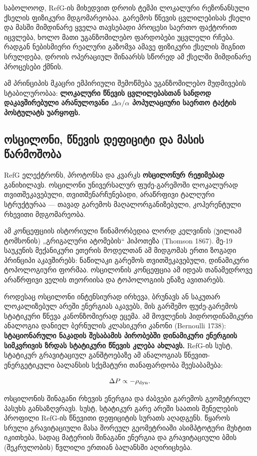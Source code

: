 \documentclass[11pt,a4paper]{article}
\begin{document}
საბოლოოდ, RefG-ის მიხედვით დროის ტემპი ლოკალური რეზონანსული ქსელის ფიზიკური მდგომარეობაა. გარემოს წნევის ცვლილებისას ქსელი და მასში მიმდინარე ყველა თავსებადი პროცესი საერთო ფაქტორით იცვლება, ხოლო მათი უგანზომილებო ფარდობები უცვლელი რჩება. რადგან ნებისმიერი რეალური გაზომვა ამავე ფიზიკური ქსელის შიგნით სრულდება, დროის ოპერაციულ შინაარსს სწორედ ამ ქსელში მიმდინარე პროცესები ქმნის.

ამ პრინციპის მკაცრი ემპირიული შემოწმება უგანზომილებო მუდმივების სტაბილურობაა: \textbf{ლოკალური წნევის ცვლილებასთან სანდოდ დაკავშირებული არანულოვანი $\Delta\alpha/\alpha$ პოპულაციური საერთო ტაქტის პოსტულატს უარყოფს.}


\subsection{ოსცილონი, წნევის დეფიციტი და მასის წარმოშობა}

RefG ელექტრონს, პროტონსა და კვარკს \textbf{ოსცილონურ რეჟიმებად} განიხილავს. ოსცილონი უნივერსალურ ფუძე-გარემოში ლოკალურად თვითშეკავებული, თვითშენარჩუნებადი, არაწრფივი ტალღური სტრუქტურაა — თავად გარემოს მაღალორგანიზებული, კოჰერენტული რხევითი მდგომარეობა.

ამ კონცეფციის ისტორიული წინამორბედია ლორდ კელვინის (უილიამ ტომსონის) „გრიგალური ატომების“ ჰიპოთეზა (Thomson 1867). მე-19 საუკუნის მექანიკური ეთერის მოდელთან ამ მიდგომას ერთი ზოგადი პრინციპი აკავშირებს: ნაწილაკი გარემოს თვითშეკავებული, დინამიკური ტოპოლოგიური ფორმაა. ოსცილონის კონცეფცია ამ იდეას თანამედროვე არაწრფივი ველის თეორიისა და ტოპოლოგიის ენაზე ავითარებს.

როდესაც ოსცილონი ინტენსიურად ირხევა, ბრუნავს ან საკუთარ ლოკალიზებულ არეში ენერგიას აკავებს, მის გარშემო ფუძე-გარემოს სტატიკური წნევა კანონზომიერად ეცემა. ამ მოვლენის ჰიდროდინამიკური ანალოგია დანიელ ბერნულის კლასიკური კანონი (Bernoulli 1738): \textbf{სტაციონარული ნაკადის შესაბამის პირობებში დინამიკური ენერგიის სიმკვრივის ზრდას სტატიკური წნევის კლება ახლავს.} RefG-ის სუსტ, სტატიკურ გრავიტაციულ განშტოებაზე ამ ანალოგიას წნევით-ენერგეტიკული ბალანსის სქემატური თანაფარდობა შეესაბამება:

\[
\Delta P \propto -\rho_{\rm dyn}.
\]

ოსცილონის შინაგანი რხევის ენერგია და ძაბვები გარემოს გეომეტრიულ პასუხს განსაზღვრავს. სუსტ, სტატიკურ გარე არეში საათის შენელების პროფილი RefG-ის წნევითი დეფიციტის სურათს აღადგენს. წყაროს სრული გრავიტაციული მასა შორეულ გეომეტრიაში ასიმპტოტური მუხტით იკითხება, სადაც მატერიის შინაგანი ენერგია და გრავიტაციული ბმის (შეკრულობის) წვლილი ერთიან ბალანსში აღირიცხება.
\end{document}
